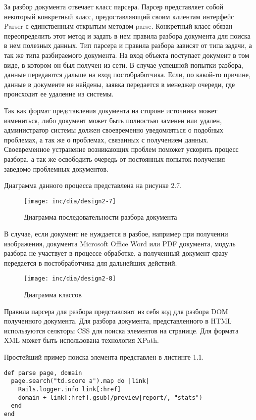 За разбор документа отвечает класс парсера. Парсер представляет собой некоторый конкретный класс, предоставляющий своим клиентам интерфейс Parser с единственным открытым методом parse. Конкретный класс обязан переопределить этот метод и задать в нем правила разбора документа для поиска в нем полезных данных. Тип парсера и правила разбора зависят от типа задачи, а так же типа разбираемого документа. На вход объекта поступает документ в том виде, в котором он был получен из сети. В случае успешной попытки разбора, данные передаются дальше на вход постобработчика. Если, по какой-то причине, данные в документе не найдены, заявка передается в менеджер очереди, где происходит ее удаление из системы. 

Так как формат представления документа на стороне источника может измениться, либо документ может быть полностью заменен или удален, администратор системы должен своевременно уведомляться о подобных проблемах, а так же о проблемах, связанных с получением данных. Своевременное устранение возникающих проблем поможет ускорить процесс разбора, а так же освободить очередь от постоянных попыток получения заведомо проблемных документов.

Диаграмма данного процесса представлена на рисунке 2.7.
\begin{figure}
  \centering
  \texttt{[image: inc/dia/design2-7]}
  \caption{Диаграмма последовательности разбора документа}
  \label{fig:fig07}
\end{figure}

В случае, если документ не нуждается в разбое, например при получении изображения, документа Microsoft Office Word или PDF документа, модуль разбора не участвует в процессе обработке, а полученный документ сразу передается в постобработчика для дальнейших действий.


\begin{figure}
  \centering
  \texttt{[image: inc/dia/design2-8]}
  \caption{Диаграмма классов}
  \label{fig:fig08}
\end{figure}

Правила парсера для разбора представляют из себя код для разбора DOM полученного документа. Для разбора документа, представленного в HTML используются селкторы CSS для поиска элементов на странице. Для формата XML может быть использована технология XPath.

Простейший пример поиска элемента представлен в листинге 1.1.

\begin{lstlisting}[caption=Поиск ссылок на странице]
def parse page, domain
  page.search("td.score a").map do |link|
    Rails.logger.info link[:href]
    domain + link[:href].gsub(/preview|report/, "stats")
  end
end
\end{lstlisting}

